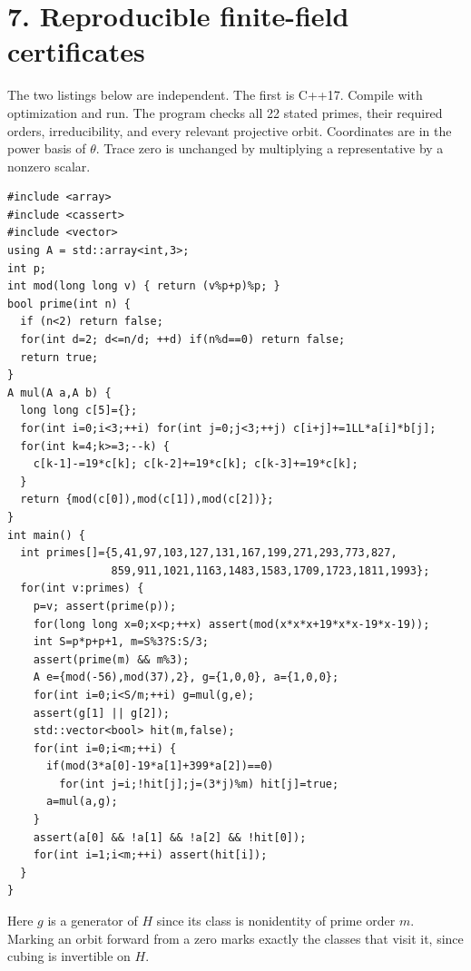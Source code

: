 \documentclass[11pt,a4paper,oneside,openany]{book}
\newcommand{\localhead}[1]{\needspace{5\baselineskip}\section*{\color{ink}#1}}
\let\sect\localhead\let\secx\localhead\let\head\localhead
\begin{document}
\sect{7. Reproducible finite-field certificates}
The two listings below are independent. The first is C++17. Compile with optimization and run. The program checks all 22 stated primes, their required orders, irreducibility, and every relevant projective orbit. Coordinates are in the power basis of $\theta$. Trace zero is unchanged by multiplying a representative by a nonzero scalar.
{\footnotesize
\begin{Verbatim}[fontsize=\footnotesize,breaklines,breakanywhere]
#include <array>
#include <cassert>
#include <vector>
using A = std::array<int,3>;
int p;
int mod(long long v) { return (v%p+p)%p; }
bool prime(int n) {
  if (n<2) return false;
  for(int d=2; d<=n/d; ++d) if(n%d==0) return false;
  return true;
}
A mul(A a,A b) {
  long long c[5]={};
  for(int i=0;i<3;++i) for(int j=0;j<3;++j) c[i+j]+=1LL*a[i]*b[j];
  for(int k=4;k>=3;--k) {
    c[k-1]-=19*c[k]; c[k-2]+=19*c[k]; c[k-3]+=19*c[k];
  }
  return {mod(c[0]),mod(c[1]),mod(c[2])};
}
int main() {
  int primes[]={5,41,97,103,127,131,167,199,271,293,773,827,
                859,911,1021,1163,1483,1583,1709,1723,1811,1993};
  for(int v:primes) {
    p=v; assert(prime(p));
    for(long long x=0;x<p;++x) assert(mod(x*x*x+19*x*x-19*x-19));
    int S=p*p+p+1, m=S%3?S:S/3;
    assert(prime(m) && m%3);
    A e={mod(-56),mod(37),2}, g={1,0,0}, a={1,0,0};
    for(int i=0;i<S/m;++i) g=mul(g,e);
    assert(g[1] || g[2]);
    std::vector<bool> hit(m,false);
    for(int i=0;i<m;++i) {
      if(mod(3*a[0]-19*a[1]+399*a[2])==0)
        for(int j=i;!hit[j];j=(3*j)%m) hit[j]=true;
      a=mul(a,g);
    }
    assert(a[0] && !a[1] && !a[2] && !hit[0]);
    for(int i=1;i<m;++i) assert(hit[i]);
  }
}
\end{Verbatim}
}
Here $g$ is a generator of $H$ since its class is nonidentity of prime order $m$. Marking an orbit forward from a zero marks exactly the classes that visit it, since cubing is invertible on $H$.
\end{document}
